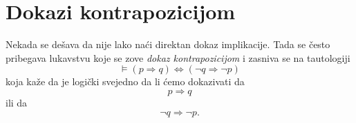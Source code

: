 %
%  
%  
%      

\section{Dokazi kontrapozicijom}

Nekada se de\v sava da nije lako na\'ci direktan dokaz implikacije. Tada se \v cesto pribegava lukavstvu
koje se zove \emph{dokaz kontrapozicijom} i zasniva se na tautologiji
$$
  \vDash (p \Rightarrow q) \Leftrightarrow (\lnot q \Rightarrow \lnot p)
$$
koja ka\v ze da je logi\v cki svejedno da li \'cemo dokazivati da
$$
  p \Rightarrow q
$$
ili da
$$
  \lnot q \Rightarrow \lnot p.
$$

